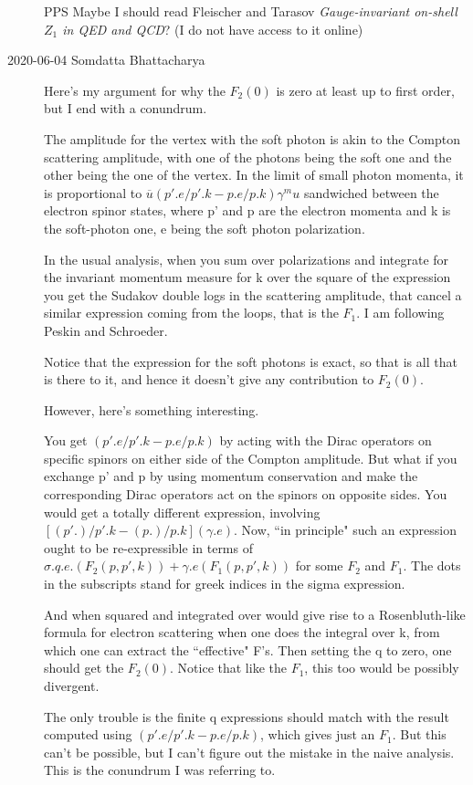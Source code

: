\begin{description}
PPS Maybe I should read
Fleischer and Tarasov
{\em Gauge-invariant on-shell {$Z_1$} in {QED} and {QCD}}?
(I do not have access to it online)

\item[2020-06-04 Somdatta Bhattacharya]
Here's my argument for why the $F_2(0)$ is zero at least up to first order,
but I end with a conundrum.

The amplitude for the vertex with the soft photon is akin to the Compton
scattering amplitude, with one of the photons being the soft one and the
other being the one of the vertex. In the limit of small photon momenta,
it is proportional to
$\overline{u}(p'.e/p'.k - p.e/p.k)\gamma^mu$
sandwiched
between the electron spinor states, where p' and p are the electron
momenta and k is the soft-photon one, e being the soft photon
polarization.

In the usual analysis, when you sum over polarizations and integrate for
the invariant momentum measure for k over the square of the expression
you get the Sudakov double logs in the scattering amplitude, that cancel
a similar expression coming from the loops, that is the $F_1$. I am
following Peskin and Schroeder.

Notice that the expression for the soft photons is exact, so that is all
that is there to it, and hence it doesn't give any contribution to
$F_2(0)$.

However, here's something interesting.

You get $(p'.e/p'.k-p.e/p.k)$ by acting with the Dirac operators on
specific spinors on either side of the Compton amplitude. But what if you
exchange p' and p by using momentum conservation and make the
corresponding Dirac operators act on the spinors on opposite sides. You
would get a totally different expression, involving
$[(p'.)/p'.k-(p.)/p.k](\gamma.e)$.
Now, ``in principle" such an expression ought to be
re-expressible in terms of
\(
\sigma. q.e. (F_2(p,p',k)) + \gamma.e(F_1(p,p',k))
\)
for some $F_2$ and $F_1$. The dots in the subscripts stand for greek
indices in the sigma expression.

And when squared and integrated over would give rise to a Rosenbluth-like
formula for electron scattering when one does the integral over k, from
which one can extract the ``effective" F's. Then setting the q to zero,
one should get the $F_2(0)$. Notice that like the $F_1$, this too would be
possibly divergent.

The only trouble is the finite q expressions should match with the result
computed using $(p'.e/p'.k - p.e/p.k)$, which gives just an $F_1$. But
this can't be possible, but I can't figure out the mistake in the naive
analysis. This is the conundrum I was referring to.


\end{description}
